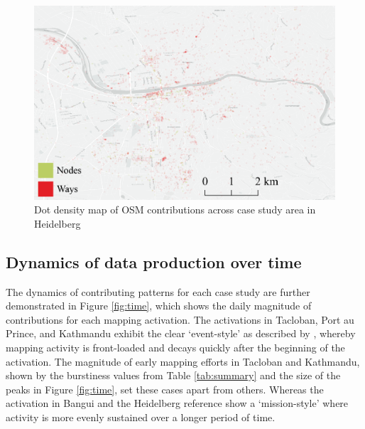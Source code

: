 \begin{figure}
    \centering 
    \includegraphics[width = \textwidth]{Images/hed_map.png}
    \caption[Heidelberg dot density map]{Dot density map of OSM contributions across case study area in Heidelberg} 
    \label{fig:hed} 
\end{figure}

\subsection{Dynamics of data production over time}


The dynamics of contributing patterns for each case study are further demonstrated in Figure \ref{fig:time}, which shows the daily magnitude of contributions for each mapping activation. The activations in Tacloban, Port au Prince, and Kathmandu exhibit the clear ‘event-style’ as described by \textcite{dittus_mass_2017}, whereby mapping activity is front-loaded and decays quickly after the beginning of the activation. The magnitude of early mapping efforts in Tacloban and Kathmandu, shown by the burstiness values from Table \ref{tab:summary} and the size of the peaks in Figure \ref{fig:time}, set these cases apart from others. Whereas the activation in Bangui and the Heidelberg reference show a ‘mission-style’ where activity is more evenly sustained over a longer period of time. 

